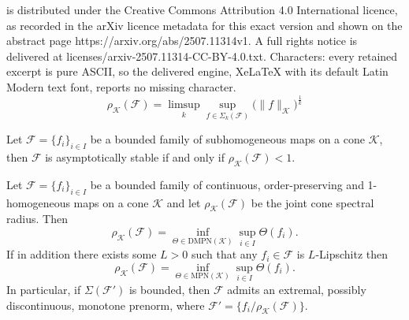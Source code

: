\documentclass[10pt,a4paper]{amsart}
\newcommand{\DMPN}{\mathrm{DMPN}}
\newcommand{\MPN}{\mathrm{MPN}}
\newcommand{\cone}{\mathcal{K}}
\newcommand{\cradius}{\rho_{\cone}}
\newcommand{\family}{\mathcal{F}}
\begin{document}
is distributed under the Creative Commons Attribution 4.0 International licence, as recorded in the arXiv licence metadata for this exact version and shown on the abstract page https://arxiv.org/abs/2507.11314v1. A full rights notice is delivered at licenses/arxiv-2507.11314-CC-BY-4.0.txt. Characters: every retained excerpt is pure ASCII, so the delivered engine, XeLaTeX with its default Latin Modern text font, reports no missing character.
\begin{equation}\label{Cone_joint_spectral_radius}
\cradius(\family)=\limsup_{k}\sup_{f\in\Sigma_k(\family)}\big(\|f\|_{\cone}\big)^{\frac{1}{k}}
\end{equation}

\begin{theorem}\label{Theorem_asymptotic_stability_via_JSR}
    Let $\family=\{f_i\}_{i\in I}$ be a bounded family of subhomogeneous maps on a cone $\cone$, then $\family$ is asymptotically stable if and only if $\cradius(\family)<1$.
\end{theorem}

\begin{theorem}\label{Thm_duality_for_the_cone_spectral_radius}
    Let $\family=\{f_i\}_{i\in I}$ be a bounded family of continuous, order-preserving and 1-homogeneous maps on a cone $\cone$ and let $\cradius(\family)$ be the joint cone spectral radius. Then 
    \begin{equation}
        \cradius(\family)=\inf_{\Theta\in \DMPN(\cone)}\sup_{i\in I}\Theta(f_i).
    \end{equation}
    If in addition there exists some $L>0$ such that any $f_i\in \family$ is $L$-Lipschitz then
    \begin{equation}
        \cradius(\family)=\inf_{\Theta\in \MPN(\cone)}\sup_{i\in I}\Theta(f_i).
    \end{equation}
    In particular, if $\Sigma(\family')$ is bounded, then $\family$ admits an extremal, possibly discontinuous, monotone prenorm, where $\family'=\{f_i/\cradius(\family)\}$.   
\end{theorem}
\end{document}
